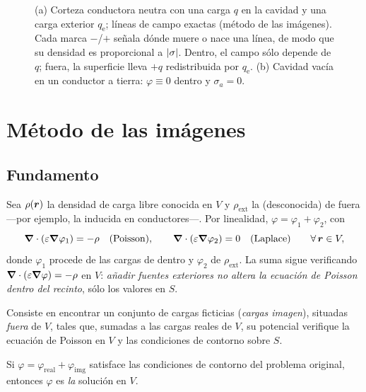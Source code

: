 \documentclass[11pt,a4paper,twoside]{article}
\begin{document}
\begin{figure}[!htb]
  \centering
  
  \caption{(a) Corteza conductora neutra con una carga $q$ en la cavidad y una carga
  exterior $q_{\mathrm e}$; líneas de campo exactas (método de las imágenes). Cada marca
  $-$/$+$ señala dónde muere o nace una línea, de modo que su densidad es proporcional a
  $\left\lvert \sigma\right\rvert$. Dentro, el campo sólo depende de $q$; fuera, la superficie lleva $+q$
  redistribuida por $q_{\mathrm e}$. (b) Cavidad vacía en un conductor a tierra:
  $\varphi\equiv0$ dentro y $\sigma_a=0$.}
  \label{fig:cavidad}
\end{figure}

\clearpage
\section{Método de las imágenes}

\subsection{Fundamento}

Sea $\rho(\bm{r})$ la densidad de carga libre conocida en $V$ y $\rho_{\mathrm{ext}}$ la
(desconocida) de fuera ---por ejemplo, la inducida en conductores---. Por linealidad,
$\varphi=\varphi_1+\varphi_2$, con
\begin{equation}\label{eq:descomposicion}
  \bm{\nabla}\cdot(\varepsilon\bm{\nabla}\varphi_1)=-\rho\quad(\text{Poisson}),\qquad
  \bm{\nabla}\cdot(\varepsilon\bm{\nabla}\varphi_2)=0\quad(\text{Laplace})\qquad\forall\,\bm{r}\in V,
\end{equation}
donde $\varphi_1$ procede de las cargas de dentro y $\varphi_2$ de $\rho_{\mathrm{ext}}$. La
suma sigue verificando $\bm{\nabla}\cdot(\varepsilon\bm{\nabla}\varphi)=-\rho$ en $V$: \emph{añadir fuentes
exteriores no altera la ecuación de Poisson dentro del recinto}, sólo los valores en $S$.

\begin{definicion}\label{def:imagenes}
Consiste en encontrar un conjunto de cargas ficticias (\emph{cargas imagen}), situadas
\emph{fuera} de $V$, tales que, sumadas a las cargas reales de $V$, su potencial verifique
la ecuación de Poisson en $V$ y las condiciones de contorno sobre $S$.
\end{definicion}

\begin{proposicion}[Justificación]\label{prop:imagenes}
Si $\varphi=\varphi_{\mathrm{real}}+\varphi_{\mathrm{img}}$ satisface las condiciones de
contorno del problema original, entonces $\varphi$ es \emph{la} solución en $V$.
\end{proposicion}
\end{document}
